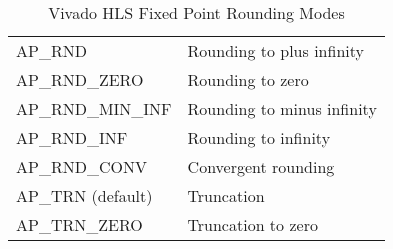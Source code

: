\begin{table}[!h]
\centering
\begin{tabular}{m{4cm} m{6cm}}
AP\_RND & Rounding to plus infinity\\
AP\_RND\_ZERO & Rounding to zero\\
AP\_RND\_MIN\_INF & Rounding to minus infinity\\
AP\_RND\_INF & Rounding to infinity\\
AP\_RND\_CONV & Convergent rounding\\
AP\_TRN (default) & Truncation\\
AP\_TRN\_ZERO & Truncation to zero
\end{tabular}
\caption{Vivado HLS Fixed Point Rounding Modes}
\label{rounding}
\end{table}